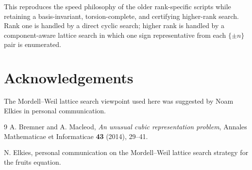 \documentclass[11pt]{article}
\begin{document}
This reproduces the speed philosophy of the older rank-specific scripts while retaining a basis-invariant, torsion-complete, and certifying higher-rank search. Rank one is handled by a direct cyclic search; higher rank is handled by a component-aware lattice search in which one sign representative from each $\{\pm n\}$ pair is enumerated.

\section*{Acknowledgements}
The Mordell--Weil lattice search viewpoint used here was suggested by Noam Elkies in personal communication.

\begin{thebibliography}{9}
A. Bremner and A. Macleod,
\emph{An unusual cubic representation problem},
Annales Mathematicae et Informaticae \textbf{43} (2014), 29--41.

N. Elkies, personal communication on the Mordell--Weil lattice search strategy for the fruits equation.
\end{thebibliography}
\end{document}
